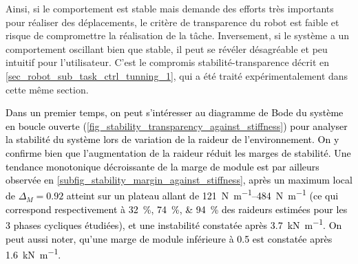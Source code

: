 Ainsi, si le comportement est stable mais demande des efforts très importants pour réaliser des déplacements, le critère de transparence du robot est faible et risque de compromettre la réalisation de la tâche. Inversement, si le système a un comportement oscillant bien que stable, il peut se révéler désagréable et peu intuitif pour l'utilisateur. C'est le compromis stabilité-transparence décrit en \cref{sec_robot_sub_task_ctrl_tunning_1}, qui a été traité expérimentalement dans cette même section.

\textcolor{black}{Dans un premier temps, on peut s'intéresser au diagramme de Bode du système en boucle ouverte (\cref{fig_stability_transparency_against_stiffness}) pour analyser la stabilité du système lors de variation de la raideur de l'environnement. On y confirme bien que l'augmentation de la raideur réduit les marges de stabilité. Une tendance monotonique décroissante de la marge de module est par ailleurs observée en \cref{subfig_stability_margin_against_stiffness}, après un maximum local de $\Delta_M=0.92$ atteint sur un plateau allant de \SIrange{121}{484}{\newton\per\meter} (ce qui correspond respectivement à \SIlist{32;74;94}{\percent} des raideurs estimées pour les 3 phases cycliques étudiées), et une instabilité constatée après \SI{3.7}{\kilo\newton\per\meter}. On peut aussi noter, qu'une marge de module inférieure à 0.5 est constatée après \SI{1.6}{\kilo\newton\per\meter}.}



